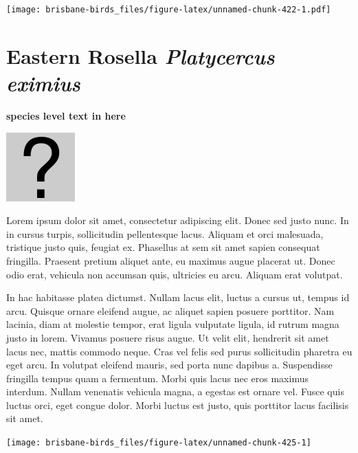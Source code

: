 \documentclass[]{book}
\let\origfigure\figure
\let\endorigfigure\endfigure
\renewenvironment{figure}[1][2] {
  \expandafter\origfigure\expandafter[H]
} {
  \endorigfigure
}
\begin{document}
\begin{figure}
\centering
\texttt{[image: brisbane-birds\_files/figure-latex/unnamed-chunk-422-1.pdf]}
\caption{\label{fig:unnamed-chunk-422}insert figure caption}
\end{figure}

\section{\texorpdfstring{Eastern Rosella \emph{Platycercus
eximius}}{Eastern Rosella Platycercus eximius}}\label{eastern-rosella-platycercus-eximius}

\textbf{species level text in here}

\begin{figure}
\centering
\includegraphics{assets/missing.png}
\caption{No image for species}
\end{figure}

Lorem ipsum dolor sit amet, consectetur adipiscing elit. Donec sed justo
nunc. In in cursus turpis, sollicitudin pellentesque lacus. Aliquam et
orci malesuada, tristique justo quis, feugiat ex. Phasellus at sem sit
amet sapien consequat fringilla. Praesent pretium aliquet ante, eu
maximus augue placerat ut. Donec odio erat, vehicula non accumsan quis,
ultricies eu arcu. Aliquam erat volutpat.

In hac habitasse platea dictumst. Nullam lacus elit, luctus a cursus ut,
tempus id arcu. Quisque ornare eleifend augue, ac aliquet sapien posuere
porttitor. Nam lacinia, diam at molestie tempor, erat ligula vulputate
ligula, id rutrum magna justo in lorem. Vivamus posuere risus augue. Ut
velit elit, hendrerit sit amet lacus nec, mattis commodo neque. Cras vel
felis sed purus sollicitudin pharetra eu eget arcu. In volutpat eleifend
mauris, sed porta nunc dapibus a. Suspendisse fringilla tempus quam a
fermentum. Morbi quis lacus nec eros maximus interdum. Nullam venenatis
vehicula magna, a egestas est ornare vel. Fusce quis luctus orci, eget
congue dolor. Morbi luctus est justo, quis porttitor lacus facilisis sit
amet.

\begin{figure}
\texttt{[image: brisbane-birds\_files/figure-latex/unnamed-chunk-425-1]} \caption{insert figure caption}\label{fig:unnamed-chunk-425}
\end{figure}
\end{document}
